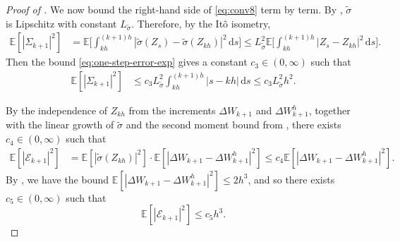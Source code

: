 \documentclass[onseside, final]{amsart}
\theoremstyle{definition}
\newcommand{\E}{\mathbb E}
\newcommand{\D}{\,\mathrm{d}}
\numberwithin{equation}{section}
\begin{document}
\begin{proof}[Proof of ]
			We now bound the right-hand side of \eqref{eq:conv8} term by term. By , $\tilde \sigma$ is Lipschitz with constant $L_{\tilde \sigma}$. Therefore, by the It\^o isometry,
			\begin{equation}
				\begin{aligned}
					\mathbb{E}[|\Sigma_{k + 1}|^{2}]
					& =
					\E \biggl[\int_{kh}^{(k+1)h} |\tilde\sigma(Z_s)-\tilde\sigma(Z_{kh})|^2 \D s\biggr]
					\le
					L_{\tilde \sigma}^2 \E \Biggl[\int_{kh}^{(k+1)h} |Z_s - Z_{kh}|^2 \D s\Biggr].
				\end{aligned}
			\end{equation}
			Then the bound
			\eqref{eq:one-step-error-exp} gives a constant $c_3\in(0,\infty)$ such that
			\begin{equation}\label{eq:conv9}
				\begin{aligned}
					\mathbb{E}[|\Sigma_{k + 1}|^{2}]
					&\le
					c_3 L_{\tilde \sigma}^2 \int_{kh}^{(k+1)h} |s-kh| \D s
					\le
					c_3 L_{\tilde \sigma}^2 h^2.
				\end{aligned}
			\end{equation}
			
			By the independence of $Z_{kh}$ from the increments $\Delta W_{k + 1}$ and $\Delta W^h_{k + 1}$, together with the linear growth of $\tilde \sigma$ and the second moment bound from , there exists $c_4\in(0,\infty)$ such that
			\begin{equation}
				\begin{aligned}
					\mathbb{E}[|\mathcal E_{k + 1}|^{2}]
					& =
					\mathbb{E}[|\tilde \sigma(Z_{kh})|^{2}] \cdot \mathbb{E}[|\Delta W_{k + 1} - \Delta W^h_{k + 1}|^{2}]
					\le
					c_4  \mathbb{E}[|\Delta W_{k  + 1} - \Delta W^h_{k + 1}|^{2}].
				\end{aligned}
			\end{equation}
			By \citep[Lemma A.3]{BaKaRo22}, we have the bound $\mathbb{E}[|\Delta W_{k + 1} - \Delta W^h_{k + 1}|^{2}] \leq 2 h^3$, and so there exists $c_5\in(0,\infty)$ such that
			\begin{equation}\label{eq:conv11}
				\mathbb{E}[|\mathcal E_{k + 1}|^{2}]\le c_5  h^3.
			\end{equation}
			

\end{proof}
\end{document}
